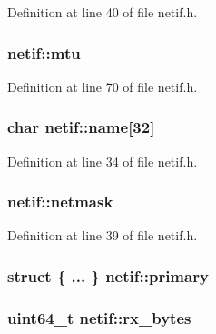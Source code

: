 Definition at line 40 of file netif.\+h.

\hypertarget{structnetif_a2eb32b1acf0a223c5cc3874da3c2f3df}{
\subsubsection[{mtu}]{ netif\+::mtu}}\label{structnetif_a2eb32b1acf0a223c5cc3874da3c2f3df}


Definition at line 70 of file netif.\+h.

\hypertarget{structnetif_ad113ca0a458623939eec5ce7fe2b6eef}{
\subsubsection[{name}]{\setlength{\rightskip}{0pt plus 5cm}char netif\+::name\mbox{[}32\mbox{]}}}\label{structnetif_ad113ca0a458623939eec5ce7fe2b6eef}


Definition at line 34 of file netif.\+h.

\hypertarget{structnetif_a36ef3cfb5f0403df355dc6db0ddc2426}{
\subsubsection[{netmask}]{ netif\+::netmask}}\label{structnetif_a36ef3cfb5f0403df355dc6db0ddc2426}


Definition at line 39 of file netif.\+h.

\hypertarget{structnetif_a367e7d85725497d7703bfc0424f472cf}{
\subsubsection[{primary}]{\setlength{\rightskip}{0pt plus 5cm}struct \{ ... \}   netif\+::primary}}\label{structnetif_a367e7d85725497d7703bfc0424f472cf}
\hypertarget{structnetif_a5a078449e22bb6f4d3d0068345d8dabc}{
\subsubsection[{rx\+\_\+bytes}]{\setlength{\rightskip}{0pt plus 5cm}uint64\+\_\+t netif\+::rx\+\_\+bytes}}\label{structnetif_a5a078449e22bb6f4d3d0068345d8dabc}


